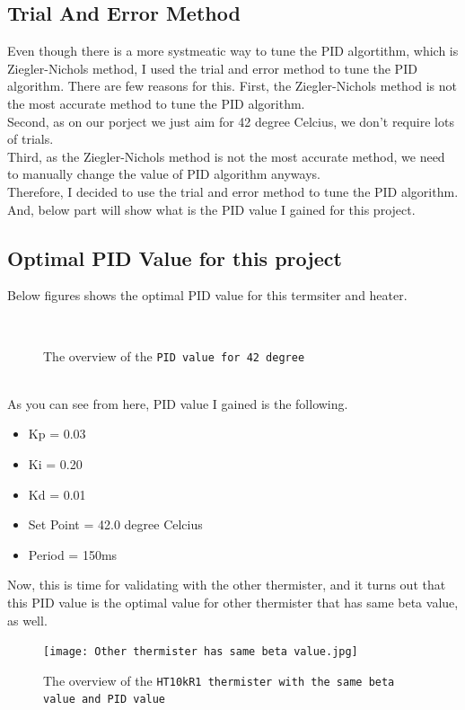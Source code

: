 \documentclass{article}
\begin{document}
\subsection{Trial And Error Method}
Even though there is a more systmeatic way to tune the PID algortithm,
which is Ziegler-Nichols method, I used the trial and error method to tune the PID algorithm.
There are few reasons for this.
First, the Ziegler-Nichols method is not the most accurate method to tune the PID algorithm. \\
Second, as on our porject we just aim for 42 degree Celcius, we don't require lots of trials. \\
Third, as the Ziegler-Nichols method is not the most accurate method, we need to manually change the value of PID algorithm anyways. \\

Therefore, I decided to use the trial and error method to tune the PID algorithm.
And, below part will show what is the PID value I gained for this project. 

\subsection{Optimal PID Value for this project}
Below figures shows the optimal PID value for this termsiter and heater. \\
\begin{figure}[htpb]
    \centering
     \\
    \caption{The overview of the \texttt{PID value for 42 degree}}
    \label{fig:s_r}
\end{figure} \\
As you can see from here, PID value I gained is the following. \\
\begin{itemize}
    \item Kp = 0.03
    \item Ki = 0.20
    \item Kd = 0.01
    \item Set Point = 42.0 degree Celcius
    \item Period = 150ms
\end{itemize}
Now, this is time for validating with the other thermister, and it turns out that this PID value is the optimal value for
other thermister that has same beta value, as well.
\begin{figure}[htpb]
    \centering
    \texttt{[image: Other thermister has same beta value.jpg]}
    \caption{The overview of the \texttt{HT10kR1 thermister with the same beta value and PID value}}
    \label{fig:s_r}
\end{figure}
\end{document}
